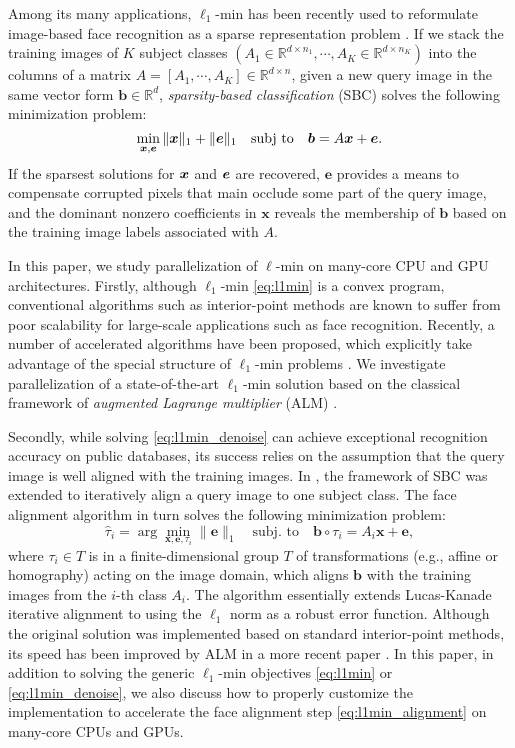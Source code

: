 \documentclass[10pt,twocolumn,letterpaper]{article}
\renewcommand{\Re}{{\mathbb{R}}}
\def\ee{{\boldsymbol{e}}}
\def\bb{{\boldsymbol{b}}}
\def\xx{{\boldsymbol{x}}}
\begin{document}
Among its many applications, $\ell_1$-min has been recently used to reformulate image-based face recognition as a sparse representation problem \cite{WrightJ2009-PAMI}.
If we stack the training images of $K$ subject classes $(A_1\in\Re^{d\times n_1}, \cdots, A_K\in\Re^{d\times n_K})$ into the columns of a matrix $A = [A_1, \cdots, A_K]\in\Re^{d\times n}$, given a new query image in the same vector form $\bb\in\Re^d$, \emph{sparsity-based classification} (SBC) solves the following minimization problem:
\begin{equation}
\min_{\xx, \ee} \| \xx \|_1 + \|\ee\|_1 \quad \subj \quad \bb = A \xx + \ee.
\label{eq:l1min_denoise}
\end{equation}
If the sparsest solutions for ${\boldsymbol{x}}$ and $\boldsymbol{e}$ are recovered, $\ee$ provides a means to compensate corrupted pixels that main occlude some part of the query image, and the dominant nonzero coefficients in $\xx$ reveals the membership of $\bb$ based on the training image labels associated with $A$.

In this paper, we study parallelization of $\ell$-min on many-core CPU and GPU architectures. Firstly, although $\ell_1$-min \eqref{eq:l1min} is a convex program, conventional algorithms such as interior-point methods \cite{ChenS2001-SIAM,TibshiraniR1996} are known to suffer from poor scalability for large-scale applications such as face recognition. Recently, a number of accelerated algorithms have been proposed, which explicitly take advantage of the special structure of $\ell_1$-min problems \cite{LorisI2009,YangA2010-ICIP}. We investigate parallelization of a state-of-the-art $\ell_1$-min solution based on the classical framework of \emph{augmented Lagrange multiplier} (ALM) \cite{BertsekasD2003,YangA2010-ICIP}.

Secondly, while solving \eqref{eq:l1min_denoise} can achieve exceptional recognition accuracy on public databases, its success relies on the assumption that the query image is well aligned with the training images. In \cite{WagnerA2009-CVPR}, the framework of SBC was extended to iteratively align a query image to one subject class. The face alignment algorithm in turn solves the following minimization problem:
\begin{equation}
\hat{\tau}_i = \arg\min_{\xx, \ee, \tau_i} \|\ee\|_1\quad \mbox{subj. to}\quad \bb\circ\tau_i = A_i\xx + \ee,
\label{eq:l1min_alignment}
\end{equation}
where $\tau_i\in T$ is in a finite-dimensional group $T$ of transformations (e.g., affine or homography) acting on the image domain, which aligns $\bb$ with the training images from the $i$-th class $A_i$. The algorithm essentially extends Lucas-Kanade iterative alignment \cite{LucasB1981} to using the $\ell_1$ norm as a robust error function.
Although the original solution \cite{WagnerA2009-CVPR} was implemented based on standard interior-point methods, its speed has been improved by ALM in a more recent paper \cite{WagnerA2011-PAMI}. In this paper, in addition to solving the generic $\ell_1$-min objectives \eqref{eq:l1min} or \eqref{eq:l1min_denoise}, we also discuss how to properly customize the implementation to accelerate the face alignment step \eqref{eq:l1min_alignment} on many-core CPUs and GPUs.
\end{document}
